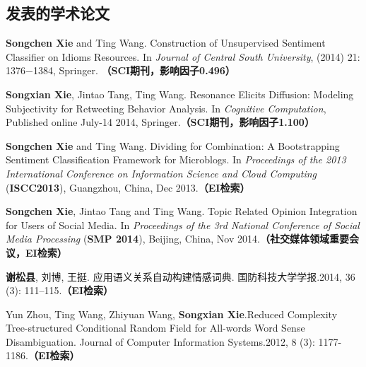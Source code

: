 \begin{resume}

  \section*{发表的学术论文} %

  \begin{enumerate}[{[}1{]}]
  \addtolength{\itemsep}{-.36\baselineskip}%
  
  \item \textbf{Songchen Xie} and Ting Wang. Construction of Unsupervised Sentiment Classifier on Idioms Resources. In {\it Journal of Central South University}, (2014) 21: 1376−1384, Springer. \textbf{（SCI期刊，影响因子0.496）}
 
 \item \textbf{Songxian Xie}, Jintao Tang, Ting Wang. Resonance Elicits Diffusion: Modeling Subjectivity for Retweeting Behavior Analysis. In {\it Cognitive Computation}, Published online July-14 2014, Springer.\textbf{（SCI期刊，影响因子1.100）}

 \item \textbf{Songchen Xie} and Ting Wang. Dividing for Combination: A Bootstrapping Sentiment Classification Framework for Microblogs. In {\it Proceedings of the 2013 International Conference on Information Science and Cloud Computing} (\textbf{ISCC2013}), Guangzhou, China, Dec 2013.\textbf{（EI检索）}
 
 \item  \textbf{Songchen Xie}, Jintao Tang and Ting Wang. Topic Related Opinion Integration for Users of Social Media. In {\it Proceedings of the 3rd National Conference of Social Media Processing} (\textbf{SMP 2014}), Beijing, China, Nov 2014.\textbf{（社交媒体领域重要会议，EI检索）}

\item \textbf{谢松县}, 刘博, 王挺. 应用语义关系自动构建情感词典. 国防科技大学学报.2014, 36 (3): 111–115.\textbf{（EI检索）}

\item Yun Zhou, Ting Wang, Zhiyuan Wang, \textbf{Songxian Xie}.Reduced Complexity Tree-structured Conditional Random Field for All-words Word Sense Disambiguation. Journal of Computer Information Systems.2012, 8 (3): 1177- 1186.\textbf{（EI检索）}

  \end{enumerate}

\end{resume}
